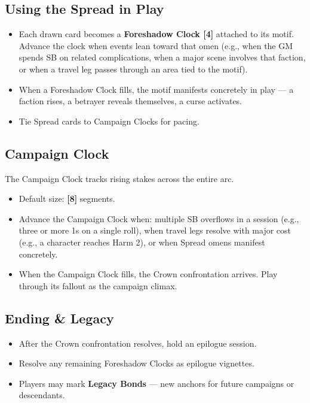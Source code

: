 \subsection{Using the Spread in Play}

\begin{itemize}
  \item Each drawn card becomes a \textbf{Foreshadow Clock [4]} attached to its motif. Advance the clock when events lean toward that omen (e.g., when the GM spends SB on related complications, when a major scene involves that faction, or when a travel leg passes through an area tied to the motif).
  \item When a Foreshadow Clock fills, the motif manifests concretely in play — a faction rises, a betrayer reveals themselves, a curse activates.
  \item Tie Spread cards to Campaign Clocks for pacing.
\end{itemize}

\subsection{Campaign Clock}

The Campaign Clock tracks rising stakes across the entire arc.

\begin{itemize}
  \item Default size: \textbf{[8]} segments.
  \item Advance the Campaign Clock when: multiple SB overflows in a session (e.g., three or more 1s on a single roll), when travel legs resolve with major cost (e.g., a character reaches Harm 2), or when Spread omens manifest concretely.
  \item When the Campaign Clock fills, the Crown confrontation arrives. Play through its fallout as the campaign climax.
\end{itemize}

\subsection{Ending \& Legacy}

\begin{itemize}
  \item After the Crown confrontation resolves, hold an epilogue session.
  \item Resolve any remaining Foreshadow Clocks as epilogue vignettes.
  \item Players may mark \textbf{Legacy Bonds} — new anchors for future campaigns or descendants.
\end{itemize}

